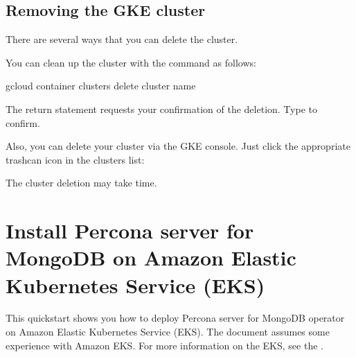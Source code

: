 \documentclass[letterpaper,10pt,english]{sphinxmanual}
\begin{document}


\section{Removing the GKE cluster}
\label{\detokenize{gke:removing-the-gke-cluster}}
There are several ways that you can delete the cluster.

You can clean up the cluster with the  command as follows:

\begin{sphinxVerbatim}[commandchars=\\\{\}]
gcloud container clusters delete \PYGZlt{}cluster name\PYGZgt{}
\end{sphinxVerbatim}

The return statement requests your confirmation of the deletion. Type  to confirm.

Also, you can delete your cluster via the GKE console. Just click the appropriate trashcan icon in the clusters list:


The cluster deletion may take time.


\chapter{Install Percona server for MongoDB on Amazon Elastic Kubernetes Service (EKS)}
\label{\detokenize{eks:install-percona-server-for-mongodb-on-amazon-elastic-kubernetes-service-eks}}\label{\detokenize{eks::doc}}
This quickstart shows you how to deploy Percona server for MongoDB operator on Amazon Elastic Kubernetes Service (EKS). The document assumes some experience with Amazon EKS. For more information on the EKS, see the .
\end{document}
